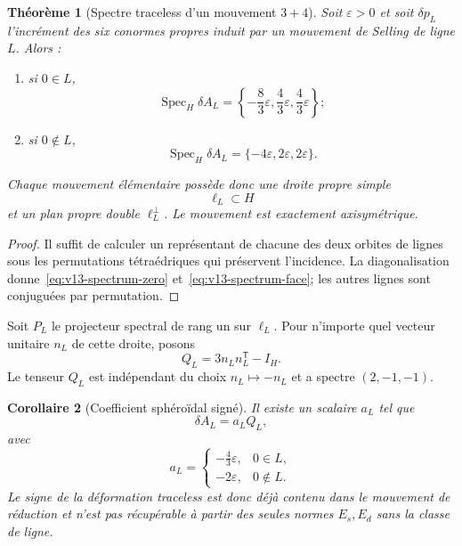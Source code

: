 \documentclass[11pt,a4paper]{article}
\newtheorem{theorem}{Théorème}[section]
\newtheorem{corollary}[theorem]{Corollaire}
\begin{document}
\begin{theorem}[Spectre traceless d'un mouvement $3+4$]\label{thm:v13-elementary-axisym}
Soit $\varepsilon>0$ et soit $\delta p_L$ l'incrément des six conormes propres induit par un mouvement de Selling de ligne $L$. Alors :
\begin{enumerate}[label=\textup{(\roman*)}]
\item si $0\in L$,
\begin{equation}\label{eq:v13-spectrum-zero}
 \boxed{
 \operatorname{Spec}_H\delta A_L
 =
 \left\{-\frac{8}{3}\varepsilon,
 \frac43\varepsilon,
 \frac43\varepsilon\right\};}
\end{equation}
\item si $0\notin L$,
\begin{equation}\label{eq:v13-spectrum-face}
 \boxed{
 \operatorname{Spec}_H\delta A_L
 =
 \{-4\varepsilon,2\varepsilon,2\varepsilon\}.}
\end{equation}
\end{enumerate}
Chaque mouvement élémentaire possède donc une droite propre simple
\[
 \ell_L\subset H
\]
et un plan propre double $\ell_L^\perp$. Le mouvement est exactement axisymétrique.
\end{theorem}

\begin{proof}
Il suffit de calculer un représentant de chacune des deux orbites de lignes sous les permutations tétraédriques qui préservent l'incidence. La diagonalisation donne~\eqref{eq:v13-spectrum-zero} et~\eqref{eq:v13-spectrum-face}; les autres lignes sont conjuguées par permutation.
\end{proof}

Soit $P_L$ le projecteur spectral de rang un sur $\ell_L$. Pour n'importe quel vecteur unitaire $n_L$ de cette droite, posons
\[
 Q_L=3n_Ln_L^{\mathsf T}-I_H.
\]
Le tenseur $Q_L$ est indépendant du choix $n_L\mapsto-n_L$ et a spectre $(2,-1,-1)$.

\begin{corollary}[Coefficient sphéroïdal signé]\label{cor:v13-D-source}
Il existe un scalaire $a_L$ tel que
\[
 \delta A_L=a_LQ_L,
\]
avec
\begin{equation}\label{eq:v13-aL}
 \boxed{
 a_L=
 \begin{cases}
 -\frac43\varepsilon,&0\in L,\\[1mm]
 -2\varepsilon,&0\notin L.
 \end{cases}}
\end{equation}
Le signe de la déformation traceless est donc déjà contenu dans le mouvement de réduction et n'est pas récupérable à partir des seules normes $E_s,E_d$ sans la classe de ligne.
\end{corollary}
\end{document}
